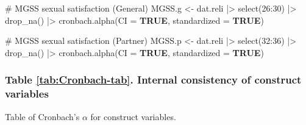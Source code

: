 \documentclass[
  bookmarksnumbered]{article}
\newenvironment{Shaded}{\begin{snugshade}}{\end{snugshade}}
\newcommand{\AttributeTok}[1]{\textcolor[rgb]{0.80,0.80,0.80}{#1}}
\newcommand{\CommentTok}[1]{\textcolor[rgb]{0.50,0.62,0.50}{#1}}
\newcommand{\ConstantTok}[1]{\textcolor[rgb]{0.86,0.64,0.64}{\textbf{#1}}}
\newcommand{\DecValTok}[1]{\textcolor[rgb]{0.86,0.86,0.80}{#1}}
\newcommand{\FunctionTok}[1]{\textcolor[rgb]{0.94,0.94,0.56}{#1}}
\newcommand{\NormalTok}[1]{\textcolor[rgb]{0.80,0.80,0.80}{#1}}
\newcommand{\OtherTok}[1]{\textcolor[rgb]{0.94,0.94,0.56}{#1}}
\newcommand{\SpecialCharTok}[1]{\textcolor[rgb]{0.86,0.64,0.64}{#1}}
\begin{document}
\begin{Shaded}
\begin{Highlighting}[]
\CommentTok{\# MGSS sexual satisfaction (General)}
\NormalTok{MGSS.g }\OtherTok{\textless{}{-}}\NormalTok{ dat.reli }\SpecialCharTok{|\textgreater{}}
  \FunctionTok{select}\NormalTok{(}\DecValTok{26}\SpecialCharTok{:}\DecValTok{30}\NormalTok{) }\SpecialCharTok{|\textgreater{}}
  \FunctionTok{drop\_na}\NormalTok{() }\SpecialCharTok{|\textgreater{}}
  \FunctionTok{cronbach.alpha}\NormalTok{(}\AttributeTok{CI =} \ConstantTok{TRUE}\NormalTok{, }\AttributeTok{standardized =} \ConstantTok{TRUE}\NormalTok{)}

\CommentTok{\# MGSS sexual satisfaction (Partner)}
\NormalTok{MGSS.p }\OtherTok{\textless{}{-}}\NormalTok{ dat.reli }\SpecialCharTok{|\textgreater{}}
  \FunctionTok{select}\NormalTok{(}\DecValTok{32}\SpecialCharTok{:}\DecValTok{36}\NormalTok{) }\SpecialCharTok{|\textgreater{}}
  \FunctionTok{drop\_na}\NormalTok{() }\SpecialCharTok{|\textgreater{}}
  \FunctionTok{cronbach.alpha}\NormalTok{(}\AttributeTok{CI =} \ConstantTok{TRUE}\NormalTok{, }\AttributeTok{standardized =} \ConstantTok{TRUE}\NormalTok{)}
\end{Highlighting}
\end{Shaded}

\subsubsection{Table \ref{tab:Cronbach-tab}. Internal consistency of construct variables}\label{table-reftabcronbach-tab.-internal-consistency-of-construct-variables}

Table of Cronbach's \(\alpha\) for construct variables.
\end{document}
